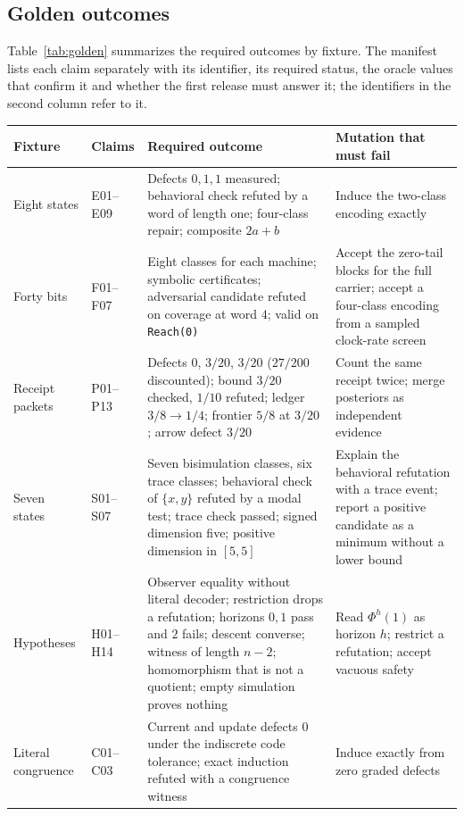 \documentclass[11pt]{article}
\newcommand{\code}[1]{\texttt{#1}}
\theoremstyle{definition}
\theoremstyle{plain}
\begin{document}
\subsection{Golden outcomes}

Table~\ref{tab:golden} summarizes the required outcomes by fixture. The manifest lists each claim
separately with its identifier, its required status, the oracle values that confirm it and whether
the first release must answer it; the identifiers in the second column refer to it.

{\small
\begin{longtable}{>{\raggedright\arraybackslash}p{2.6cm}>{\raggedright\arraybackslash}p{1.5cm}>{\raggedright\arraybackslash}p{5.4cm}>{\raggedright\arraybackslash}p{4.2cm}}
\toprule
Fixture & Claims & Required outcome & Mutation that must fail\\
\midrule
\endhead
Eight states & E01--E09 & Defects $0,1,1$ measured; behavioral check refuted by a word of length one; four-class repair; composite $2a+b$ & Induce the two-class encoding exactly\\
Forty bits & F01--F07 & Eight classes for each machine; symbolic certificates; adversarial candidate refuted on coverage at word $4$; valid on \code{Reach(0)} & Accept the zero-tail blocks for the full carrier; accept a four-class encoding from a sampled clock-rate screen\\
Receipt packets & P01--P13 & Defects $0$, $3/20$, $3/20$ ($27/200$ discounted); bound $3/20$ checked, $1/10$ refuted; ledger $3/8\to1/4$; frontier $5/8$ at $3/20$; arrow defect $3/20$ & Count the same receipt twice; merge posteriors as independent evidence\\
Seven states & S01--S07 & Seven bisimulation classes, six trace classes; behavioral check of $\{x,y\}$ refuted by a modal test; trace check passed; signed dimension five; positive dimension in $[5,5]$ & Explain the behavioral refutation with a trace event; report a positive candidate as a minimum without a lower bound\\
Hypotheses & H01--H14 & Observer equality without literal decoder; restriction drops a refutation; horizons $0,1$ pass and $2$ fails; descent converse; witness of length $n-2$; homomorphism that is not a quotient; empty simulation proves nothing & Read $\Phi^h(1)$ as horizon $h$; restrict a refutation; accept vacuous safety\\
Literal congruence & C01--C03 & Current and update defects $0$ under the indiscrete code tolerance; exact induction refuted with a congruence witness & Induce exactly from zero graded defects\\

\end{longtable}}
\end{document}
